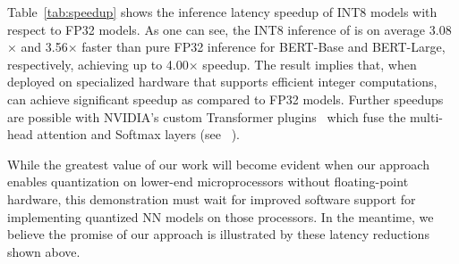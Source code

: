Table~\ref{tab:speedup} shows the inference latency speedup of INT8 models with respect to FP32 models.
As one can see, the INT8 inference of \OURS is on average 3.08$\times$ and 3.56$\times$ faster than pure FP32 inference for BERT-Base and BERT-Large, respectively, achieving up to 4.00$\times$ speedup.
The result implies that, when deployed on specialized hardware that supports efficient integer computations, \OURS can achieve significant speedup as compared to FP32 models.
Further speedups are possible with NVIDIA's custom Transformer plugins~\cite{tensorrtbert} which fuse
the multi-head attention and Softmax layers (see ~).

While the greatest value of our work will become evident when 
our approach enables quantization on lower-end microprocessors
without floating-point hardware, 
this demonstration must wait for improved software
support for implementing quantized NN models on those processors.
In the meantime, we believe the promise of our approach is
illustrated by these latency reductions shown above.


\begin{table}[!t]
\caption{ 
Inference latency speedup of INT8 inference with respect to FP32 inference for BERT-Base and BERT-Large. 
Latency is measured for different sentence lengths (SL) and batch sizes (BS). 
}

\vskip 0.1in
\label{tab:speedup}

    \centering
    \small{
    }


\vspace{3mm}
\end{table}

